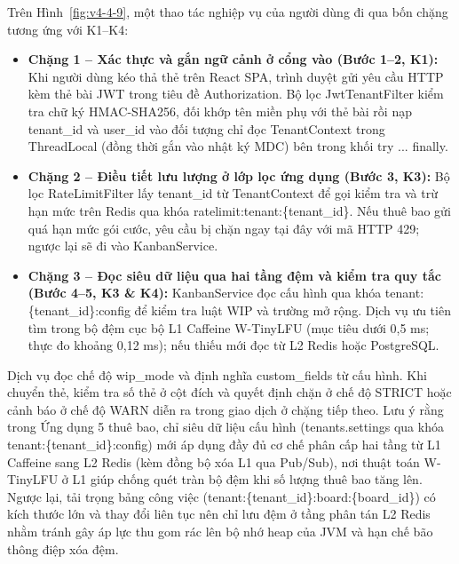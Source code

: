 Trên Hình~\ref{fig:v4-4-9}, một thao tác nghiệp vụ của người dùng đi qua bốn chặng tương ứng với K1--K4:

\begin{itemize}
\item
  \textbf{Chặng 1 -- Xác thực và gắn ngữ cảnh ở cổng vào (Bước 1--2, K1):} Khi người dùng kéo thả thẻ trên React SPA, trình duyệt gửi yêu cầu HTTP kèm thẻ bài JWT trong tiêu đề Authorization. Bộ lọc JwtTenantFilter kiểm tra chữ ký HMAC-SHA256, đối khớp tên miền phụ với thẻ bài rồi nạp tenant\_\allowbreak{}id và user\_\allowbreak{}id vào đối tượng chỉ đọc TenantContext trong ThreadLocal (đồng thời gắn vào nhật ký MDC) bên trong khối try ... finally.
\item
  \textbf{Chặng 2 -- Điều tiết lưu lượng ở lớp lọc ứng dụng (Bước 3, K3):} Bộ lọc RateLimitFilter lấy tenant\_\allowbreak{}id từ TenantContext để gọi kiểm tra và trừ hạn mức trên Redis qua khóa ratelimit:tenant:\{tenant\_\allowbreak{}id\}. Nếu thuê bao gửi quá hạn mức gói cước, yêu cầu bị chặn ngay tại đây với mã HTTP 429; ngược lại sẽ đi vào KanbanService.
\item
  \textbf{Chặng 3 -- Đọc siêu dữ liệu qua hai tầng đệm và kiểm tra quy tắc (Bước 4--5, K3 \& K4):} KanbanService đọc cấu hình qua khóa tenant:\{tenant\_\allowbreak{}id\}:config để kiểm tra luật WIP và trường mở rộng. Dịch vụ ưu tiên tìm trong bộ đệm cục bộ L1 Caffeine W-TinyLFU (mục tiêu dưới 0,5 ms; thực đo khoảng 0,12 ms); nếu thiếu mới đọc từ L2 Redis hoặc PostgreSQL.
\end{itemize}

Dịch vụ đọc chế độ wip\_\allowbreak{}mode và định nghĩa custom\_\allowbreak{}fields từ cấu hình. Khi chuyển thẻ, kiểm tra số thẻ ở cột đích và quyết định chặn ở chế độ STRICT hoặc cảnh báo ở chế độ WARN diễn ra trong giao dịch ở chặng tiếp theo. Lưu ý rằng trong Ứng dụng 5 thuê bao, chỉ siêu dữ liệu cấu hình (tenants.settings qua khóa tenant:\{tenant\_\allowbreak{}id\}:config) mới áp dụng đầy đủ cơ chế phân cấp hai tầng từ L1 Caffeine sang L2 Redis (kèm đồng bộ xóa L1 qua Pub/Sub), nơi thuật toán W-TinyLFU ở L1 giúp chống quét tràn bộ đệm khi số lượng thuê bao tăng lên. Ngược lại, tải trọng bảng công việc (tenant:\{tenant\_\allowbreak{}id\}:board:\{board\_\allowbreak{}id\}) có kích thước lớn và thay đổi liên tục nên chỉ lưu đệm ở tầng phân tán L2 Redis nhằm tránh gây áp lực thu gom rác lên bộ nhớ heap của JVM và hạn chế bão thông điệp xóa đệm.

